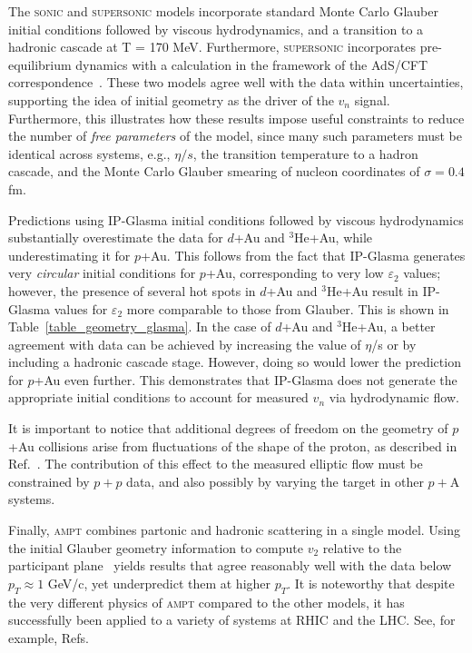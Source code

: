 \documentclass[%
reprint,
showpacs,preprintnumbers,
 amsmath,amssymb,
 aps,
]{revtex4-1}
\newcommand{\pt}{\mbox{$p_T$}\xspace}
\newcommand{\dau}{\mbox{$d$+Au}\xspace}
\newcommand{\pau}{\mbox{$p$+Au}\xspace}
\newcommand{\hau}{\mbox{$^3\text{He}$+Au}\xspace}
\begin{document}
The \textsc{sonic} and \textsc{supersonic} models incorporate standard Monte Carlo Glauber initial conditions followed by viscous hydrodynamics, and a transition to a hadronic cascade at T = 170 MeV. Furthermore, \textsc{supersonic} incorporates pre-equilibrium dynamics with a calculation in the framework of the AdS/CFT correspondence~\cite{vanderSchee:2013pia,Chesler:2015wra,Romatschke:2013re}. These two models agree well with the data within uncertainties, supporting the idea of initial geometry as the driver of the $v_n$ signal. Furthermore, this illustrates how these results impose useful constraints to reduce the number of \emph{free parameters} of the model, since many such parameters must be identical across systems, e.g., $\eta/s$, the transition temperature to a hadron cascade, and the  Monte Carlo Glauber smearing of nucleon coordinates of $\sigma=0.4$ fm.

Predictions using IP-Glasma initial conditions followed by viscous hydrodynamics substantially overestimate the data for \dau and \hau, while underestimating it for \pau. This follows from the fact that IP-Glasma generates very \emph{circular} initial conditions for \pau, corresponding to very low $\varepsilon_2$ values; however, the presence of several hot spots in \dau and \hau result in IP-Glasma values for $\varepsilon_2$ more comparable to those from Glauber. This is shown in Table~\ref{table_geometry_glasma}. In the case of \dau and \hau, a better agreement with data can be achieved by increasing the value of $\eta$/s or by including a hadronic cascade stage. However, doing so would lower the prediction for \pau even further. This demonstrates that IP-Glasma does not generate the appropriate initial conditions to account for measured $v_n$ via hydrodynamic flow. 

It is important to notice that additional degrees of freedom on the geometry of \pau collisions arise from fluctuations of the shape of the proton, as described in Ref.~\cite{Schlichting:2014ipa}. The contribution of this effect to the measured elliptic flow must be constrained by $p+p$ data, and also possibly by varying the target in other $p+$A systems.

Finally, \textsc{ampt} combines partonic and hadronic scattering in a single model. Using the initial Glauber geometry information to compute $v_2$ relative to the participant plane~\cite{Koop:2015wea} yields results that agree reasonably well with the data below $\pt \approx 1$ GeV/c, yet underpredict them at higher \pt. It is noteworthy that despite the very different physics of \textsc{ampt} compared to the other models, it has successfully been applied to a variety of systems at RHIC and the LHC. See, for example, Refs.~\cite{Adare:2015cpn,Koop:2015wea,Ma:2016fve,ma_long-range_2014,ma_long-range_2014}
\end{document}
